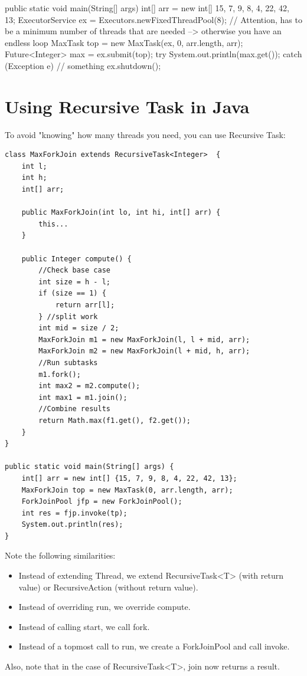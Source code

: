 \documentclass{article}
\begin{document}
public static void main(String[] args) {
    int[] arr = new int[] {15, 7, 9, 8, 4, 22, 42, 13};
    ExecutorService ex = Executors.newFixedThreadPool(8); // Attention, has to be a minimum number of threads that are needed --> otherwise you have an endless loop
    MaxTask top = new MaxTask(ex, 0, arr.length, arr);
    Future<Integer> max = ex.submit(top);
    try {
        System.out.println(max.get());
    } catch (Exception e) {
        // something
    }
    ex.shutdown();
}


\section{Using Recursive Task in Java}
To avoid "knowing" how many threads you need, you can use Recursive Task:

\begin{lstlisting}[style=java]
class MaxForkJoin extends RecursiveTask<Integer>  {
    int l;
    int h;
    int[] arr;

    public MaxForkJoin(int lo, int hi, int[] arr) {
        this...
    }

    public Integer compute() {
        //Check base case
        int size = h - l;
        if (size == 1) {
            return arr[l];
        } //split work
        int mid = size / 2;
        MaxForkJoin m1 = new MaxForkJoin(l, l + mid, arr);
        MaxForkJoin m2 = new MaxForkJoin(l + mid, h, arr);
        //Run subtasks
        m1.fork();
        int max2 = m2.compute();
        int max1 = m1.join();
        //Combine results
        return Math.max(f1.get(), f2.get());
    }
}

public static void main(String[] args) {
    int[] arr = new int[] {15, 7, 9, 8, 4, 22, 42, 13};
    MaxForkJoin top = new MaxTask(0, arr.length, arr);
    ForkJoinPool jfp = new ForkJoinPool();
    int res = fjp.invoke(tp);
    System.out.println(res);
}
\end{lstlisting}

Note the following similarities:
\begin{itemize}
    \item Instead of extending Thread, we extend RecursiveTask<T> (with return value) or RecursiveAction (without return value).
    \item Instead of overriding run, we override compute.
    \item Instead of calling start, we call fork.
    \item Instead of a topmost call to run, we create a ForkJoinPool and call invoke.
\end{itemize}
Also, note that in the case of RecursiveTask<T>, join now returns a result.
\end{document}
